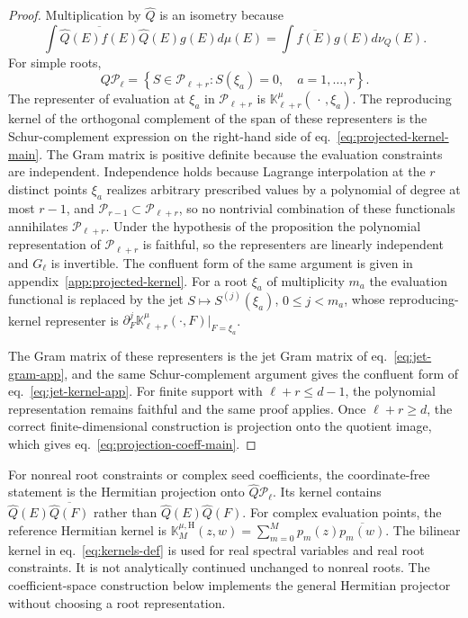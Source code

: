 \documentclass[a4paper,11pt]{article}
\def\dd{d}%
\theoremstyle{definition}
\theoremstyle{remark}
\newcommand{\dd}{\mathrm d}
\newcommand{\cP}{\mathcal P}
\newcommand{\Qhat}{\widehat Q}
\begin{document}
\begin{proof}
Multiplication by $\Qhat$ is an isometry because
\begin{equation}
   \int
   \overline{\Qhat(E)f(E)}
   \Qhat(E)g(E)\dd\mu(E)
   =
   \int
   \overline{f(E)}g(E)\dd\nu_Q(E).
\end{equation}
For simple roots,
\begin{equation}
   Q\cP_\ell
   =
   \left\{
      S\in\cP_{\ell+r}:
      S(\xi_a)=0,\quad a=1,\ldots,r
   \right\}.
\end{equation}
The representer of evaluation at $\xi_a$ in $\cP_{\ell+r}$ is
$\mathbb K_{\ell+r}^\mu(\,\cdot\,,\xi_a)$. The reproducing kernel of the orthogonal complement of the span of these representers is the Schur-complement expression on the right-hand side of
eq.~\eqref{eq:projected-kernel-main}. The Gram matrix is positive definite because the evaluation constraints are independent. Independence holds because Lagrange interpolation at the $r$ distinct points $\xi_a$ realizes arbitrary prescribed values by a polynomial of degree at most $r-1$, and $\cP_{r-1}\subset\cP_{\ell+r}$, so no nontrivial combination of these functionals annihilates $\cP_{\ell+r}$. Under the hypothesis of the proposition the polynomial representation of $\cP_{\ell+r}$ is faithful, so the representers are linearly independent and $G_\ell$ is invertible. The confluent form of the same argument is given in appendix~\ref{app:projected-kernel}. For a root $\xi_a$ of multiplicity $m_a$ the evaluation functional is replaced by the jet $S\mapsto S^{(j)}(\xi_a)$, $0\le j<m_a$, whose reproducing-kernel representer is
$\partial_F^j\mathbb K^\mu_{\ell+r}(\cdot,F)|_{F=\xi_a}$. 

The Gram matrix of these representers is the jet Gram matrix of eq.~\eqref{eq:jet-gram-app}, and the same Schur-complement argument gives the confluent form of eq.~\eqref{eq:jet-kernel-app}. For finite support with $\ell+r\le d-1$, the polynomial representation remains faithful and the same proof applies. Once $\ell+r\ge d$, the correct finite-dimensional construction is projection onto the quotient image, which gives eq.~\eqref{eq:projection-coeff-main}.
\end{proof}

For nonreal root constraints or complex seed coefficients, the coordinate-free statement is the Hermitian projection onto
$\Qhat\cP_\ell$. Its kernel contains
$\Qhat(E)\overline{\Qhat(F)}$ rather than
$\Qhat(E)\Qhat(F)$. For complex evaluation points, the reference Hermitian kernel is
$
   \mathbb K_M^{\mu,\mathrm H}(z,w)
   =
   \sum_{m=0}^{M}p_m(z)\overline{p_m(w)}.
$
The bilinear kernel in eq.~\eqref{eq:kernels-def} is used for real spectral variables and real root constraints. It is not analytically continued unchanged to nonreal roots. The coefficient-space construction below implements the general Hermitian projector without choosing a root representation.
\end{document}
